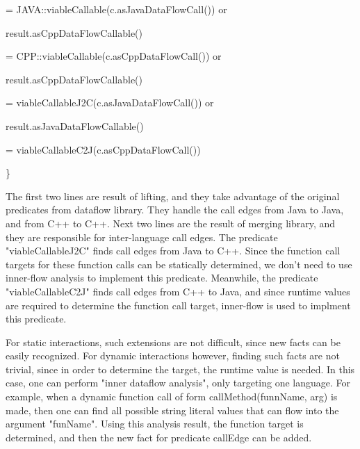   = JAVA::viableCallable(c.asJavaDataFlowCall()) or

result.asCppDataFlowCallable()

  = CPP::viableCallable(c.asCppDataFlowCall()) or

result.asCppDataFlowCallable()

  = viableCallableJ2C(c.asJavaDataFlowCall()) or

result.asJavaDataFlowCallable()

  = viableCallableC2J(c.asCppDataFlowCall())

\}

The first two lines are result of lifting, and they take advantage of the original predicates from dataflow library.
They handle the call edges from Java to Java, and from C++ to C++.
Next two lines are the result of merging library, and they are responsible for inter-language call edges.
The predicate "viableCallableJ2C" finds call edges from Java to C++. Since the function call targets for
these function calls can be statically determined, we don't need to use inner-flow analysis to implement this predicate.
Meanwhile, the predicate "viableCallableC2J" finds call edges from C++ to Java, and since runtime values are required to
determine the function call target, inner-flow is used to implment this predicate.


For static interactions, such extensions are not difficult, since new facts can be easily recognized.
For dynamic interactions however, finding such facts are not trivial, since in order to determine the
target, the runtime value is needed. In this case, one can perform "inner dataflow analysis", only targeting
one language. For example, when a dynamic function call of form callMethod(funnName, arg) is made,
then one can find all possible string literal values that can flow into the argument "funName". Using this
analysis result, the function target is determined, and then the new fact for predicate callEdge can be added.
